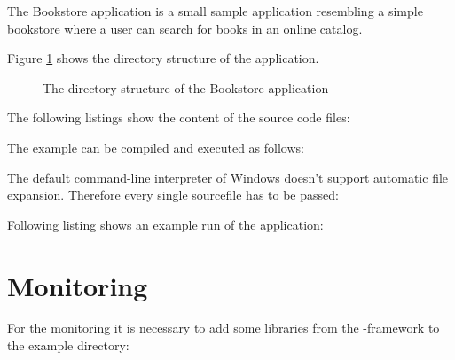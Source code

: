 The Bookstore application is a small sample application resembling a simple bookstore where a user can search for books in an online catalog.

Figure \ref{Figure:PlainBookstoreExample} shows the directory structure of the application.

\begin{figure}[H]
\begin{graybox}
\end{graybox}

\caption{The directory structure of the Bookstore application}
\label{Figure:PlainBookstoreExample}
\end{figure}

\noindent The following listings show the content of the source code files:

\setJavaCodeListing





\noindent The example can be compiled and executed as follows:
\setBashListing

\warning The default command-line interpreter of Windows doesn't support automatic file expansion. Therefore every single sourcefile has to be passed:

Following listing shows an example run of the application:


\section{Monitoring}\label{sec:example:monitoring}
For the monitoring it is necessary to add some libraries from the \Kieker{}-framework to the example directory:
\begin{figure}[H]
\begin{graybox}
\end{graybox}
\end{figure}

